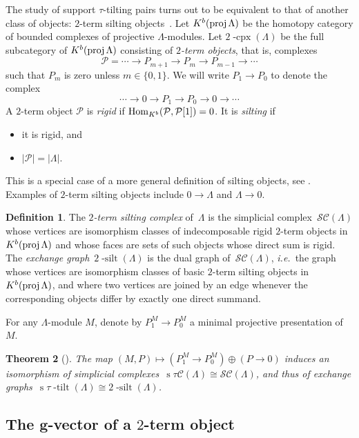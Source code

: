 \documentclass{amsart}
\newtheorem{theorem}{Theorem}%
\theoremstyle{definition}
\newtheorem{definition}[theorem]{Definition}
\renewcommand{\b}[1]{\mathbf{#1}} %
\newcommand{\ie}{\textit{i.e.}~} %
\newcommand{\darkblue}{\color{darkblue}} %
\newcommand{\defn}[1]{\textsl{\darkblue #1}} %
\newcommand{\complexP}{\mathcal{P}} %
\newcommand{\stau}{\operatorname{s} \! \tau \! \operatorname{-tilt}}
\newcommand{\cpx}{2 \! \operatorname{-cpx}}
\newcommand{\silt}{2 \! \operatorname{-silt}}
\newcommand{\siltingComplex}{\mathcal{SC}}
\newcommand{\tiltingComplex}{\operatorname{s} \! \tau\mathcal{C}}
\newcommand{\proj}{\operatorname{{\rm proj }}}
\newcommand{\Hom}[1]{\operatorname{{\rm Hom}}_{#1}}
\begin{document}
The study of support $\tau$-tilting pairs turns out to be equivalent to that of another class of objects: $2$-term silting objects~\cite[Sect.~3]{AdachiIyamaReiten}.
Let $K^b(\proj \Lambda)$ be the homotopy category of bounded complexes of projective $\Lambda$-modules. 
Let $\cpx(\Lambda)$ be the full subcategory of $K^b(\proj \Lambda)$ consisting of \defn{$2$-term objects}, that is, complexes
\[
  \complexP = \cdots \to P_{m+1} \to P_m \to P_{m-1} \to \cdots
\]
such that $P_m$ is zero unless $m\in \{0,1\}$.  
We will write $P_1\to P_0$ to denote the complex
\[
\cdots \to 0 \to P_1 \to P_0 \to 0 \to \cdots
\]
A $2$-term object $\complexP$ is \defn{rigid} if $\Hom{K^b}(\complexP, \complexP[1]) = 0$.  It is \defn{silting} if
\begin{itemize}
 \item it is rigid, and 
 \item $|\complexP| = |\Lambda|$.
\end{itemize}
This is a special case of a more general definition of silting objects, see \cite{KellerVossieck}.
Examples of $2$-term silting objects include $0\to \Lambda$ and $\Lambda \to 0$.

\begin{definition}
The \defn{$2$-term silting complex} of~$\Lambda$ is the simplicial complex~$\siltingComplex(\Lambda)$ whose vertices are isomorphism classes of indecomposable rigid $2$-term objects in $K^b(\proj \Lambda)$ and whose faces are sets of such objects whose direct sum is rigid.
The \defn{exchange graph}~$\silt(\Lambda)$ is the dual graph of~$\siltingComplex(\Lambda)$, \ie the graph whose vertices are isomorphism classes of basic $2$-term silting objects in $K^b(\proj \Lambda)$, and where two vertices are joined by an edge whenever the corresponding objects differ by exactly one direct summand.
\end{definition}

For any $\Lambda$-module $M$, denote by $P_1^M\to P_0^M$ a minimal projective presentation of $M$.

\begin{theorem}[{\cite[Thm.~3.2]{AdachiIyamaReiten}}]
The map $(M,P) \mapsto (P_1^M\to P_0^M) \oplus (P\to 0)$ induces an isomorphism of simplicial complexes~$\tiltingComplex(\Lambda) \cong \siltingComplex(\Lambda)$, and thus of exchange graphs~${\stau(\Lambda) \cong \silt(\Lambda)}$.
\end{theorem}


\subsection{The $\b{g}$-vector of a $2$-term object}
\end{document}
